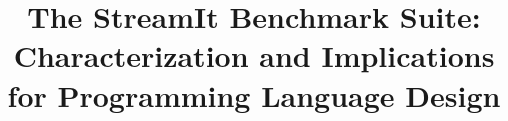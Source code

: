 \documentclass{sig-alternate}
\begin{document}
\setlength{\columnsep}{0.2in}
\setlength{\textwidth}{7.0in}
\setlength{\textheight}{9.375in}

\newcommand{\eightpoint}{\fontsize{8pt}{10pt}\selectfont}
\newcommand{\ninepoint}{\fontsize{9pt}{11pt}\selectfont}
\newcommand{\sixteenpoint}{\fontsize{16pt}{18pt}\selectfont}
\newcommand{\myitem}[1]{\subsection{#1}\smallskip}

\title{The StreamIt Benchmark Suite: Characterization and Implications
  for Programming Language Design}





\maketitle

\begin{abstract}

\end{abstract}






%


{\small


}
\end{document}
